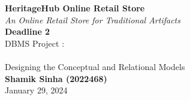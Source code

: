 \begin{titlepage}
    \begin{center}
    
    
    {\fontsize{24}{48}\selectfont \bfseries HeritageHub Online Retail Store}
    \\\vspace{5pt}
    {\fontsize{15}{48}\selectfont \textit{An Online Retail Store for Traditional Artifacts}}
    \\\vspace{40pt}
    {\fontsize{35}{48}\selectfont \bfseries Deadline 2} 
    \\\vspace{20pt}
    {\LARGE DBMS Project : \\
    \\\vspace{10pt}
    Designing the Conceptual and Relational Models} \\
    \vspace{20pt}
    \textbf{{\fontsize{18}{22}\selectfont Shamik Sinha (2022468)}}
        \vspace{8pt}
        \\ {\fontsize{16}{19.2}\selectfont January 29, 2024}
    \end{center}
\end{titlepage}